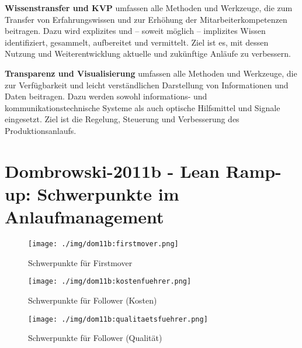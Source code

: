  \textbf{Wissenstransfer und KVP} umfassen
alle Methoden und Werkzeuge, die
zum Transfer von Erfahrungswissen
und zur Erhöhung der Mitarbeiterkompetenzen beitragen. Dazu wird
explizites und – soweit möglich – implizites Wissen identifiziert, gesammelt, aufbereitet und vermittelt. Ziel
ist es, mit dessen Nutzung und
Weiterentwicklung aktuelle und zukünftige Anläufe zu verbessern.

 \textbf{Transparenz und Visualisierung} umfassen alle Methoden und Werkzeuge,
die zur Verfügbarkeit und leicht verständlichen Darstellung von Informationen und Daten beitragen. Dazu
werden sowohl informations- und
kommunikationstechnische Systeme
als auch optische Hilfsmittel und Signale eingesetzt. Ziel ist die Regelung,
Steuerung und Verbesserung des Produktionsanlaufs.

\newpage

\section{Dombrowski-2011b - Lean Ramp-up: Schwerpunkte im Anlaufmanagement}
\begin{figure}[h!]
 \centering
 \texttt{[image: ./img/dom11b:firstmover.png]}
 \caption[Schwerpunkte für Firstmover]{Schwerpunkte für Firstmover \cite{Dombrowski2011b}}
 \label{fig:dom11b:firstmover}
% 
% 
 \centering
 \texttt{[image: ./img/dom11b:kostenfuehrer.png]}
 \caption[Schwerpunkte für Follower (Kosten)]{Schwerpunkte für Follower (Kosten) \cite{Dombrowski2011b}}
 \label{fig:dom11b:kostenfuehrer}
% 
% 
 \centering
 \texttt{[image: ./img/dom11b:qualitaetsfuehrer.png]}
 \caption[Schwerpunkte für Follower (Qualität)]{Schwerpunkte für Follower (Qualität) \cite{Dombrowski2011b}}
 \label{fig:dom11b:qualitaetsfuehrer}
\end{figure}
\restoregeometry